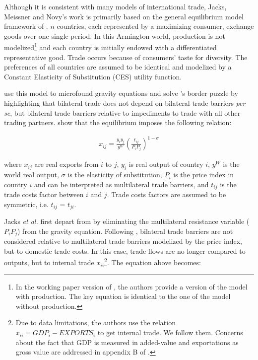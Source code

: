 \documentclass{article}
\begin{document}
Although it is consistent with many models of international
trade, Jacks, Meissner and Novy's work is primarily based on
the general equilibrium model framework of \cite{AW2003}. $n$
countries, each represented by a maximizing consumer, exchange
goods over one single period. In this Armington world,
production is not modelized\footnote{In the working paper
version of \cite{JMN2010}, the authors provide a version of the
model with production. The key equation is identical to the one
of the model without production.} and each country is initially
endowed with a differentiated representative good. Trade occurs
because of consumers' taste for diversity. The preferences of
all countries are assumed to be identical and modelized by a
Constant Elasticity of Substitution (CES) utility function.

\cite{AW2003} use this model to microfound gravity equations
and solve \cite{MAC}'s border puzzle by highlighting that
bilateral trade does not depend on bilateral trade barriers \textit{per
se}, but bilateral trade barriers relative to impediments to
trade with all other trading partners. \cite{AW2003} show that the
equilibrium imposes the following relation:

\begin{eqnarray}
x_{ij}=\frac{y_i y_j}{y^W}\left(\frac{t_{ij}}{P_i P_j}\right)^{1-\sigma}
\end{eqnarray}

where $x_{ij}$ are real exports from $i$ to $j$, $y_i$ is real
output of country $i$, $y^W$ is the world real output, $\sigma$
is the elasticity of substitution, $P_i$ is the price index in
country $i$ and can be interpreted as multilateral trade
barriers, and $t_{ij}$ is the trade costs factor between $i$
and $j$. Trade costs factors are assumed to be symmetric, i.e.
$t_{ij}$ = $t_{ji}$.

Jacks \textit{et al.} first depart from \cite{AW2003} by eliminating the
multilateral resistance variable ($P_i P_j$) from the gravity equation.
Following \cite{NOVY}, bilateral trade barriers are not
considered relative to multilateral trade barriers modelized by
the price index, but to domestic trade costs. In this case,
trade flows are no longer compared to outputs, but to internal
trade $x_{ii}$\footnote{Due to data limitations, the authors
use the relation $x_{ii}=GDP_i-EXPORTS_i$ to get internal
trade. We follow them. Concerns about the fact that GDP is
measured in added-value and exportations as gross value are
addressed in appendix B of \cite{JMN2011}.}. The equation above
becomes:
\end{document}
